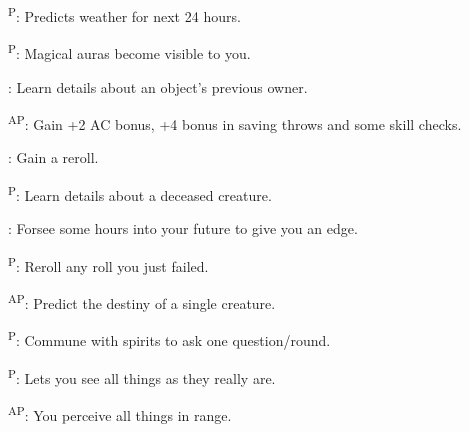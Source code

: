 \begin{enumerate*}
      \textsuperscript{P}: Predicts weather for next 24 hours.

\item {}\textsuperscript{P}: Magical auras become visible to you.

      : Learn details about an object's previous owner.

      \textsuperscript{AP}: Gain +2 AC bonus, +4 bonus in saving throws and some skill checks.

      : Gain a reroll. %

\item {}\textsuperscript{P}: Learn details about a deceased creature.

      : Forsee some hours into your future to give you an edge.

\item {}\textsuperscript{P}: Reroll any roll you just failed. %

      \textsuperscript{AP}: Predict the destiny of a single creature.

\item {}\textsuperscript{P}: Commune with spirits to ask one question/round.

      \textsuperscript{P}: Lets you see all things as they really are.

\item {}\textsuperscript{AP}: You perceive all things in range.
\end{enumerate*}



